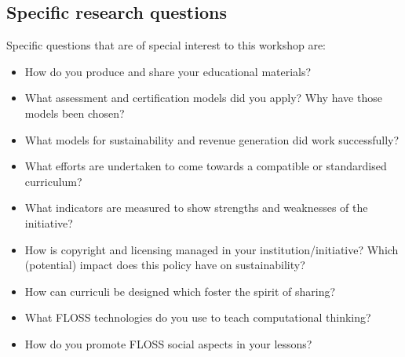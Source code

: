 \documentclass[a4paper,10pt]{article}
\begin{document}
\subsection*{Specific research questions}
Specific questions that are of special interest to this workshop are: 
\begin{itemize}
 \item How do you produce and share your educational materials? 
 \item What assessment and certification models did you apply? Why have those models been chosen? 
 \item What models for sustainability and revenue generation did work successfully? 
 \item What efforts are undertaken to come towards a compatible or standardised curriculum? 
 \item What indicators are measured to show strengths and weaknesses of the initiative? 
 \item How is copyright and licensing managed in your institution/initiative? Which (potential) impact does this policy have on sustainability? 
 \item How can curriculi be designed which foster the spirit of sharing? 
 \item What FLOSS technologies do you use to teach computational thinking?
 \item How do you promote FLOSS social aspects in your lessons?
\end{itemize}
\end{document}

